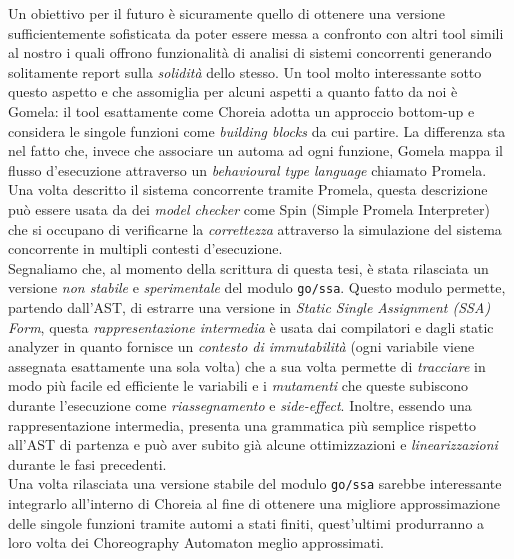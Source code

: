 Un obiettivo per il futuro è sicuramente quello di ottenere una versione sufficientemente sofisticata da poter essere messa a confronto con altri tool simili al nostro i quali offrono funzionalità di analisi di sistemi concorrenti generando solitamente report sulla \emph{solidità} dello stesso. Un tool molto interessante sotto questo aspetto e che assomiglia per alcuni aspetti a quanto fatto da noi è Gomela\cite{Gomela}: il tool esattamente come Choreia adotta un approccio bottom-up e considera le singole funzioni come \emph{building blocks} da cui partire. La differenza sta nel fatto che, invece che associare un automa ad ogni funzione, Gomela mappa il flusso d'esecuzione attraverso un \emph{behavioural type language} chiamato Promela\cite{Promela}. Una volta descritto il sistema concorrente tramite Promela, questa descrizione può essere usata da dei \emph{model checker} come Spin\cite{Spin} (Simple Promela Interpreter) che si occupano di verificarne la \emph{correttezza} attraverso la simulazione del sistema concorrente in multipli contesti d'esecuzione.\bigskip \\
Segnaliamo che, al momento della scrittura di questa tesi, è stata rilasciata un versione \emph{non stabile} e \emph{sperimentale} del modulo \texttt{go/ssa}. Questo modulo permette, partendo dall'AST, di estrarre una versione in \emph{Static Single Assignment (SSA) Form}\cite{SSA_Form}, questa \emph{rappresentazione intermedia} è usata dai compilatori e dagli static analyzer in quanto fornisce un \emph{contesto di immutabilità} (ogni variabile viene assegnata esattamente una sola volta) che a sua volta permette di \emph{tracciare} in modo più facile ed efficiente le variabili e i \emph{mutamenti} che queste subiscono durante l'esecuzione come \emph{riassegnamento} e \emph{side-effect}. Inoltre, essendo una rappresentazione intermedia, presenta una grammatica più semplice rispetto all'AST di partenza e può aver subito già alcune ottimizzazioni e \emph{linearizzazioni} durante le fasi precedenti.\\
Una volta rilasciata una versione stabile del modulo \texttt{go/ssa} sarebbe interessante integrarlo all'interno di Choreia al fine di ottenere una migliore approssimazione delle singole funzioni tramite automi a stati finiti, quest'ultimi produrranno a loro volta dei Choreography Automaton meglio approssimati.